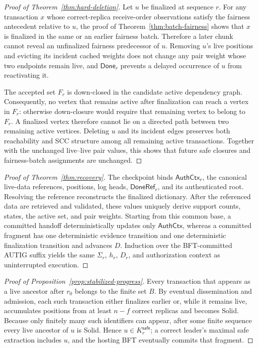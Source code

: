 \begin{proof}[Proof of Theorem~\ref{thm:hard-deletion}]
Let $u$ be finalized at sequence $r$.  For any transaction $x$ whose
correct-replica receive-order observations satisfy the fairness antecedent
relative to $u$, the proof of
Theorem~\ref{thm:batch-fairness} shows that $x$ is finalized in the same or
an earlier fairness batch.  Therefore a later chunk cannot reveal an
unfinalized fairness predecessor of $u$.  Removing $u$'s live positions and
evicting its incident cached weights does not change any pair weight whose two
endpoints remain live, and $\mathsf{Done}_r$ prevents a delayed occurrence of $u$ from
reactivating it.

The accepted set $F_r$ is down-closed in the candidate active dependency graph.
Consequently, no vertex that remains active after finalization can reach a
vertex in $F_r$: otherwise down-closure would require that remaining vertex
to belong to $F_r$.  A finalized vertex therefore cannot lie on a directed
path between two remaining active vertices.  Deleting $u$ and its incident
edges preserves both reachability and SCC structure among all remaining
active transactions.  Together with the unchanged live--live pair values,
this shows that future safe closures and fairness-batch assignments are
unchanged.
\end{proof}

\begin{proof}[Proof of Theorem~\ref{thm:recovery}]
The checkpoint binds $\mathsf{AuthCtx}_r$, the canonical live-data references,
positions, log heads, $\mathsf{DoneRef}_r$, and its authenticated root.  Resolving the
reference reconstructs the finalized dictionary.  After the referenced data
are retrieved and validated, these values uniquely derive support counts, states,
the active set, and pair weights.  Starting from this common base, a committed
handoff deterministically updates only $\mathsf{AuthCtx}$, whereas a committed
fragment has one deterministic evidence transition and one deterministic
finalization transition and advances $D$.  Induction over the BFT-committed
AUTIG suffix yields the same $\Sigma_r$, $h_r$, $D_r$, and authorization context
as uninterrupted execution.
\end{proof}

\begin{proof}[Proof of Proposition~\ref{prop:stabilized-progress}]
Every transaction that appears as a live ancestor after $r_0$ belongs to the
finite set $B$.  By eventual dissemination and admission, each such
transaction either finalizes earlier or, while it remains live, accumulates
positions from at least $n-f$ correct replicas and becomes Solid.  Because
only finitely many such identifiers can appear, after some finite sequence
every live ancestor of $u$ is Solid.  Hence $u\in K_r^{\mathsf{safe}}$; a
correct leader's maximal safe extraction includes $u$, and the hosting BFT
eventually commits that fragment.
\end{proof}

